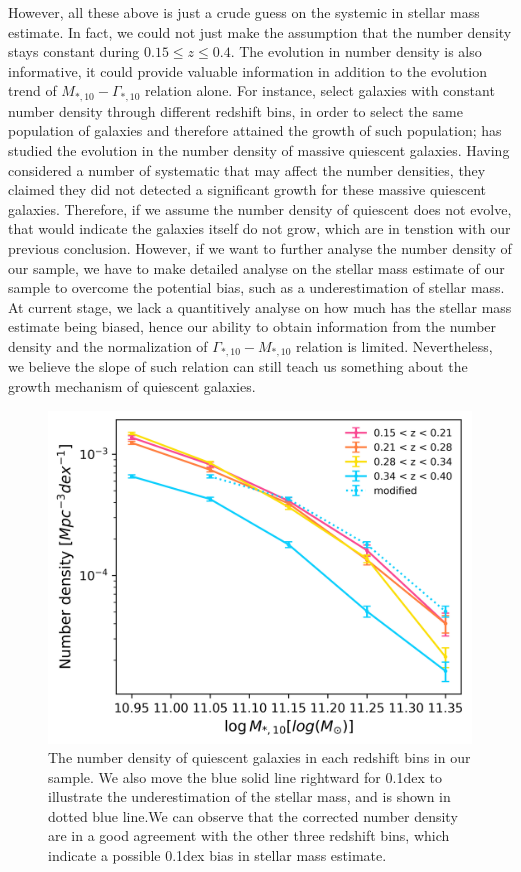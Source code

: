 \documentclass[fleqn,usenatbib]{mnras}
\begin{document}
\par However, all these above is just a crude guess on the systemic in stellar mass estimate. In fact, we could not just make the assumption that the number density stays constant during $0.15 \leq z \leq 0.4$. The evolution in number density is also informative, it could provide valuable information in addition to the evolution trend of $M_{*,10} - \Gamma_{*,10}$ relation alone. For instance, \cite{van_dokkum_growth_2010} select galaxies with constant number density through different redshift bins, in order to select the same population of galaxies and therefore attained the growth of such population; \cite{Bundy2017} has studied the evolution in the number density of massive quiescent galaxies. Having considered a number of systematic that may affect the number densities, they claimed they did not detected a significant growth for these massive quiescent galaxies. Therefore, if we assume the number density of quiescent does not evolve, that would indicate the galaxies itself do not grow, which are in tenstion with our previous conclusion. However, if we want to further analyse the number density of our sample, we have to make detailed analyse on the stellar mass estimate of our sample to overcome the potential bias, such as a underestimation of stellar mass. At current stage, we lack a quantitively analyse on how much has the stellar mass estimate being biased, hence our ability to obtain information from the number density and the normalization of $\Gamma_{*,10} - M_{*,10}$ relation is limited. Nevertheless, we believe the slope of such relation can still teach us something about the growth mechanism of quiescent galaxies.  
\begin{figure}
    \centering
    \includegraphics[width=0.95\linewidth]{figure/number_density.png}
    \caption{The number density of quiescent galaxies in each redshift bins in our sample. We also move the blue solid line rightward for 0.1dex to illustrate the underestimation of the stellar mass, and is shown in dotted blue line.We can observe that the corrected number density are in a good agreement with the other three redshift bins, which indicate a possible 0.1dex bias in stellar mass estimate.}
    \label{fig:number_density}
\end{figure}
\end{document}
